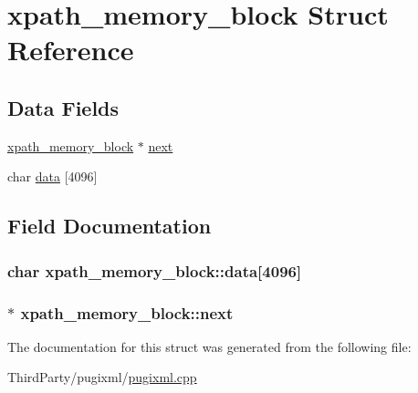 \hypertarget{structxpath__memory__block}{\section{xpath\-\_\-memory\-\_\-block Struct Reference}
\label{structxpath__memory__block}
}
\subsection*{Data Fields}
\begin{DoxyCompactItemize}
\item 
\hyperlink{structxpath__memory__block}{xpath\-\_\-memory\-\_\-block} $\ast$ \hyperlink{structxpath__memory__block_ab7f0d8400b40a51cdb063e76fd19a93c}{next}
\item 
char \hyperlink{structxpath__memory__block_a7b00376d0eac172ab537b6b0964858a9}{data} \mbox{[}4096\mbox{]}
\end{DoxyCompactItemize}


\subsection{Field Documentation}
\hypertarget{structxpath__memory__block_a7b00376d0eac172ab537b6b0964858a9}{
\subsubsection[{data}]{\setlength{\rightskip}{0pt plus 5cm}char xpath\-\_\-memory\-\_\-block\-::data\mbox{[}4096\mbox{]}}}\label{structxpath__memory__block_a7b00376d0eac172ab537b6b0964858a9}
\hypertarget{structxpath__memory__block_ab7f0d8400b40a51cdb063e76fd19a93c}{
\subsubsection[{next}]{$\ast$ xpath\-\_\-memory\-\_\-block\-::next}}\label{structxpath__memory__block_ab7f0d8400b40a51cdb063e76fd19a93c}


The documentation for this struct was generated from the following file\-:\begin{DoxyCompactItemize}
\item 
Third\-Party/pugixml/\hyperlink{pugixml_8cpp}{pugixml.\-cpp}\end{DoxyCompactItemize}
